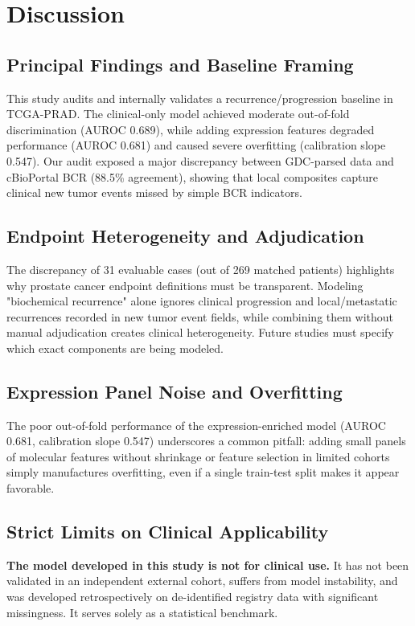 \documentclass[11pt]{article}
\begin{document}
\section{Discussion}
\subsection{Principal Findings and Baseline Framing}
This study audits and internally validates a recurrence/progression baseline in TCGA-PRAD. The clinical-only model achieved moderate out-of-fold discrimination (AUROC 0.689), while adding expression features degraded performance (AUROC 0.681) and caused severe overfitting (calibration slope 0.547). Our audit exposed a major discrepancy between GDC-parsed data and cBioPortal BCR (88.5\% agreement), showing that local composites capture clinical new tumor events missed by simple BCR indicators.

\subsection{Endpoint Heterogeneity and Adjudication}
The discrepancy of 31 evaluable cases (out of 269 matched patients) highlights why prostate cancer endpoint definitions must be transparent. Modeling "biochemical recurrence" alone ignores clinical progression and local/metastatic recurrences recorded in new tumor event fields, while combining them without manual adjudication creates clinical heterogeneity. Future studies must specify which exact components are being modeled.

\subsection{Expression Panel Noise and Overfitting}
The poor out-of-fold performance of the expression-enriched model (AUROC 0.681, calibration slope 0.547) underscores a common pitfall: adding small panels of molecular features without shrinkage or feature selection in limited cohorts simply manufactures overfitting, even if a single train-test split makes it appear favorable.

\subsection{Strict Limits on Clinical Applicability}
\textbf{The model developed in this study is not for clinical use.} It has not been validated in an independent external cohort, suffers from model instability, and was developed retrospectively on de-identified registry data with significant missingness. It serves solely as a statistical benchmark.
\end{document}
